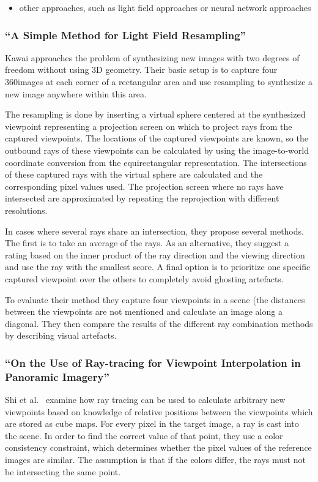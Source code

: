 \begin{itemize}
  \item other approaches, such as light field approaches or neural network approaches
\end{itemize}

\subsubsection{``A Simple Method for Light Field Resampling'' \cite{simple_poster}}
Kawai \cite{simple_poster} approaches the problem of synthesizing new images with two degrees of freedom without using 3D geometry. Their basic setup is to capture four 360\degree images at each corner of a rectangular area and use resampling to synthesize a new image anywhere within this area.

The resampling is done by inserting a virtual sphere centered at the synthesized viewpoint representing a projection screen on which to project rays from the captured viewpoints. The locations of the captured viewpoints are known, so the outbound rays of these viewpoints can be calculated by using the image-to-world coordinate conversion from the equirectangular representation. The intersections of these captured rays with the virtual sphere are calculated and the corresponding pixel values used. The projection screen where no rays have intersected are approximated by repeating the reprojection with different resolutions.

In cases where several rays share an intersection, they propose several methods. The first is to take an average of the rays. As an alternative, they suggest a rating based on the inner product of the ray direction and the viewing direction and use the ray with the smallest score. A final option is to prioritize one specific captured viewpoint over the others to completely avoid ghosting artefacts.

To evaluate their method they capture four viewpoints in a scene (the distances between the viewpoints are not mentioned and calculate an image along a diagonal. They then compare the results of the different ray combination methods by describing visual artefacts.

\subsubsection{``On the Use of Ray-tracing for Viewpoint Interpolation in Panoramic Imagery'' \cite{raytracing}}
Shi et al.\ \cite{raytracing} examine how ray tracing can be used to calculate arbitrary new viewpoints based on knowledge of relative positions between the viewpoints which are stored as cube maps. For every pixel in the target image, a ray is cast into the scene. In order to find the correct value of that point, they use a color consistency constraint, which determines whether the pixel values of the reference images are similar. The assumption is that if the colors differ, the rays must not be intersecting the same point.

